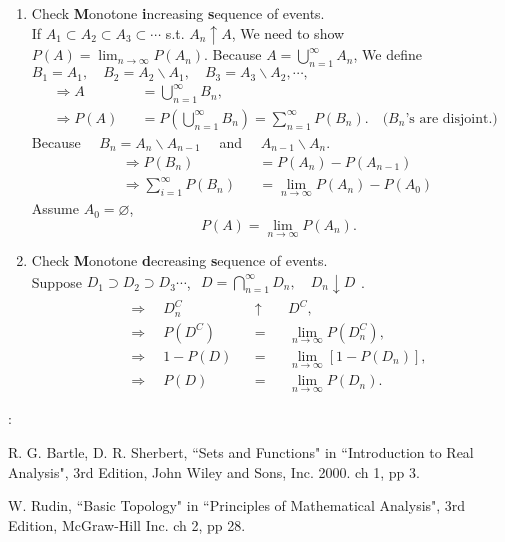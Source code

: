 \documentclass[12pt,thmsa]{article}
\let\emptyset\varnothing
\begin{document}
\begin{enumerate}[label=\roman*)] %
	\item Check \textbf{M}onotone \textbf{i}ncreasing \textbf{s}equence of events. \\
	If \(A_{1} \subset A_{2} \subset A_{3} \subset \cdots\) s.t. \(A_{n} \uparrow A\), We need to show \(P(A)=\lim _{n \rightarrow \infty} P\left(A_{n}\right)\). Because \(A=\bigcup_{n=1}^{\infty} A_{n}\), We define \(B_{1}=A_{1}, \quad B_{2}=A_{2} \backslash A_{1}, \quad B_{3}=A_{3} \backslash A_{2}, \cdots,\)
	\[
	\begin{aligned}
		&\Rightarrow A & &= \bigcup_{n=1}^{\infty} B_{n}, \\
		&\Rightarrow P(A) & &=P\left(\bigcup_{n=1}^{\infty} B_{n}\right)=\sum_{n=1}^{\infty} P\left(B_{n}\right). \quad (B_{n}\text{'s are disjoint.) }
	\end{aligned}
	\]
	Because \(\quad B_{n}=A_{n} \backslash A_{n-1} \quad \) and \( \quad A_{n-1} \backslash A_{n}\).
	\[
	\begin{aligned}
		&\Rightarrow P\left(B_{n}\right) && = P\left(A_{n}\right)- P\left(A_{n-1}\right) \\
		&\Rightarrow \sum_{i=1}^{\infty} P\left(B_{n}\right)&& =\lim _{n \rightarrow \infty} P\left(A_{n}\right)-P\left(A_{0}\right)
	\end{aligned}
	\]
	Assume \(A_{0}=\emptyset\), \[\quad P(A)=\lim _{n \rightarrow \infty} P\left(A_{n}\right).\]
	\item Check \textbf{M}onotone \textbf{d}ecreasing \textbf{s}equence of events. \\
	Suppose \(D_{1} \supset D_{2} \supset D_{3} \cdots\), \(\begin{aligned} D=\bigcap_{n=1}^{\infty} D_{n} , \quad D_{n} \downarrow D \end{aligned}\).
	\[\begin{aligned}
		&\Rightarrow  \quad  D_{n}^{C}& & \uparrow & & D^{C}, \\
		&\Rightarrow \quad P\left(D^{C}\right)& & = & & \lim _{n \rightarrow \infty} P\left(D_{n}^{C}\right), \\
		&\Rightarrow \quad 1-P(D) & &= & &\lim _{n \rightarrow \infty}\left[1-P\left(D_{n}\right)\right], \\
		& \Rightarrow \quad P(D) & &= & &\lim _{n \rightarrow \infty} P\left(D_{n}\right).
	\end{aligned}
	\]
\end{enumerate}




\noindent
[Ref]: 

R. G. Bartle, D. R. Sherbert, ``Sets and Functions" in ``Introduction to Real Analysis", 3rd Edition, John Wiley and Sons, Inc. 2000. ch 1, pp 3.

W. Rudin, ``Basic Topology" in ``Principles of Mathematical Analysis", 3rd Edition, McGraw-Hill Inc. ch 2, pp 28.
\end{document}
